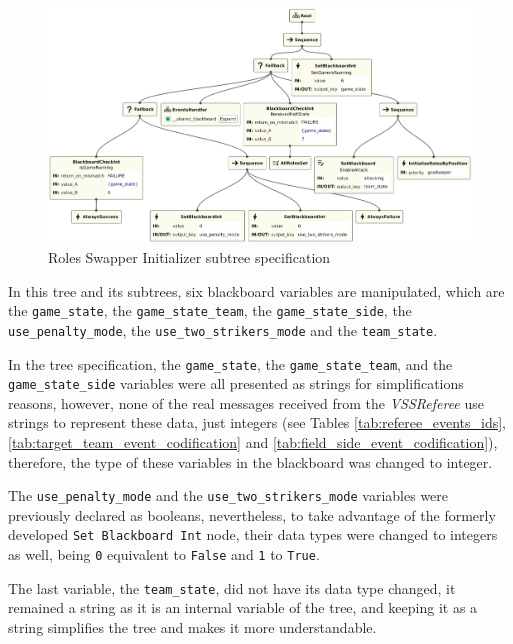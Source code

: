 \begin{figure}[!h]
    \centering
    \includegraphics[width=1.0\linewidth]{chapters/development/images/RolesSwapperInitializer.png}
    \caption{Roles Swapper Initializer subtree specification}
    \label{fig:roles_swapper_initializer_impl}
\end{figure}

In this tree and its subtrees, six blackboard variables are manipulated, which are the \texttt{game\_state}, the \texttt{game\_state\_team}, the \texttt{game\_state\_side}, the \texttt{use\_penalty\_mode}, the \texttt{use\_two\_strikers\_mode} and the \texttt{team\_state}.

In the tree specification, the \texttt{game\_state}, the \texttt{game\_state\_team}, and the \texttt{game\_state\_side} variables were all presented as strings for simplifications reasons, however, none of the real messages received from the \textit{VSSReferee} use strings to represent these data, just integers (see Tables \ref{tab:referee_events_ids}, \ref{tab:target_team_event_codification} and \ref{tab:field_side_event_codification}), therefore, the type of these variables in the blackboard was changed to integer.

The \texttt{use\_penalty\_mode} and the \texttt{use\_two\_strikers\_mode} variables were previously declared as booleans, nevertheless, to take advantage of the formerly developed \texttt{Set Blackboard Int} node, their data types were changed to integers as well, being \texttt{0} equivalent to \texttt{False} and \texttt{1} to \texttt{True}.

The last variable, the \texttt{team\_state}, did not have its data type changed, it remained a string as it is an internal variable of the tree, and keeping it as a string simplifies the tree and makes it more understandable.

